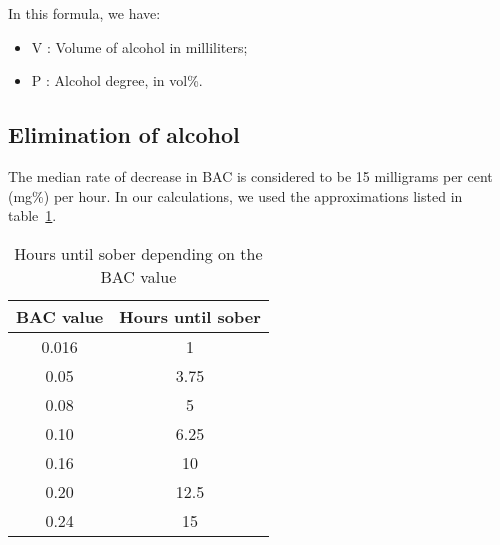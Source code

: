 In this formula, we have:

\begin{itemize}[noitemsep]
\item V : Volume of alcohol in milliliters;
\item P : Alcohol degree, in vol\%.
\end{itemize}

\subsection{Elimination of alcohol}
\label{ssec:elim}

The median rate of decrease in BAC is considered to be 15 milligrams per cent (mg\%) per hour. In our calculations, we used the approximations listed in {\sc table}~\ref{tab:elim}.

\begin{table}[H]
\centering
\begin{tabular}{|c|c|}
  \hline
  \bf{BAC value} & \bf{Hours until sober}\\
  \hline
	0.016 & 1\\
	0.05 & 3.75\\
	0.08 & 5\\
	0.10 & 6.25\\
	0.16 & 10\\
	0.20 & 12.5\\
	0.24 & 15\\
  \hline
\end{tabular}
\caption{Hours until sober depending on the BAC value}
\label{tab:elim}
\end{table}